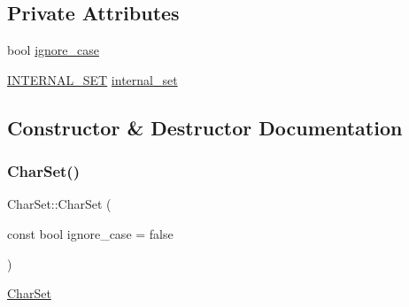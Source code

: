 \subsection*{Private Attributes}
\begin{DoxyCompactItemize}
\item 
bool \mbox{\hyperlink{classlucene_1_1core_1_1analysis_1_1characterutil_1_1CharSet_a02b6c12938776a5c94003f6ebe784f17}{ignore\+\_\+case}}
\item 
\mbox{\hyperlink{namespacelucene_1_1core_1_1analysis_1_1characterutil_a2b64bd3cca4a8e9112fcbfaebc68aeee}{I\+N\+T\+E\+R\+N\+A\+L\+\_\+\+S\+ET}} \mbox{\hyperlink{classlucene_1_1core_1_1analysis_1_1characterutil_1_1CharSet_a67bb6add3ad46d8eb68c867aadbc2798}{internal\+\_\+set}}
\end{DoxyCompactItemize}


\subsection{Constructor \& Destructor Documentation}
\mbox{\label{classlucene_1_1core_1_1analysis_1_1characterutil_1_1CharSet_a983251c2914f0fbbb46cb6e73864474f}} 
\subsubsection{\texorpdfstring{Char\+Set()}{CharSet()}\hspace{0.1cm}{\footnotesize\ttfamily [1/6]}}
{\footnotesize\ttfamily Char\+Set\+::\+Char\+Set (\begin{DoxyParamCaption}\item[{const bool}]{ignore\+\_\+case = {\ttfamily false} }\end{DoxyParamCaption})\hspace{0.3cm}{\ttfamily [explicit]}}

\mbox{\hyperlink{classlucene_1_1core_1_1analysis_1_1characterutil_1_1CharSet}{Char\+Set}} \mbox{\label{classlucene_1_1core_1_1analysis_1_1characterutil_1_1CharSet_a86ec41a435119d58269b961894bcb88c}} 
